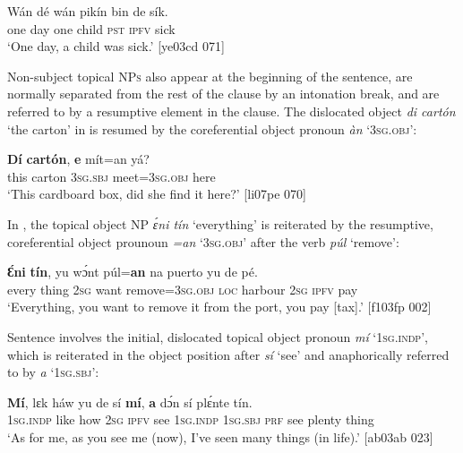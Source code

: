 \ea%
    \label{ex:key:749}
    \gll Wán    dé  wán  pikín  bin  de  sík.\\
one    day  one  child  \textsc{pst}  \textsc{ipfv}  sick\\

\glt ‘One day, a child was sick.’ [ye03cd 071]
\z

Non-subject topical \textsc{NPs} also appear at the beginning of the sentence, are normally separated from the rest of the clause by an intonation break, and are referred to by a resumptive element in the clause. The dislocated object \textit{di cartón} ‘the carton’ in  is resumed by the coreferential object pronoun \textit{àn} ‘\textsc{3sg.obj}’:


\ea%
    \label{ex:key:750}
    \gll \textbf{Dí}  \textbf{cartón},  \textbf{e} mít=an    yá?\\
this  carton  \textsc{3sg.sbj}  meet=\textsc{3sg.obj}  here\\

\glt ‘This cardboard box, did she find it here?’ [li07pe 070]
\z

In , the topical object NP \textit{ɛ́ni tín} ‘everything’ is reiterated by the resumptive, coreferential object prounoun \textit{=an} ‘\textsc{3sg.obj}’ after the verb \textit{púl} ‘remove’:


\ea%
    \label{ex:key:751}
    \gll \textbf{Ɛ́ni}    \textbf{tín},    yu  wɔ́nt  púl=\textbf{an} 
na  puerto  yu  de  pé. \\
every  thing  \textsc{2sg}  want  remove=\textsc{3sg.obj} 
\textsc{loc}  harbour  \textsc{2sg}  \textsc{ipfv}  pay\\

\glt ‘Everything, you want to remove it from the port, you pay [tax].’ [f103fp 002]
\z

Sentence  involves the initial, dislocated topical object pronoun \textit{mí} ‘\textsc{1sg.indp}’, which is reiterated in the object position after \textit{sí} ‘see’ and anaphorically referred to by \textit{a} ‘\textsc{1sg.sbj}’: 


\ea%
    \label{ex:key:752}
    \gll \textbf{Mí},    lɛk  háw    yu  de  sí  \textbf{mí},    \textbf{a}    dɔ́n  
sí  plɛ́nte  tín.\\
\textsc{1sg.indp}  like  how    \textsc{2sg}  \textsc{ipfv}  see  \textsc{1sg.indp}  \textsc{1sg.sbj}  \textsc{prf}   
see  plenty  thing \\

\glt ‘As for me, as you see me (now), I’ve seen many things (in life).’ [ab03ab 023]
\z

